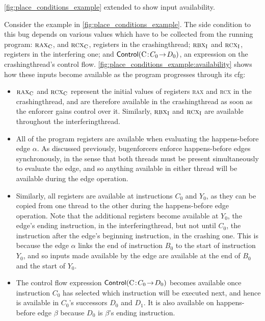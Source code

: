 \begin{sanefig}
  \vspace{-12pt}
  \caption{\autoref{fig:place_conditions_example} extended to show
    input availability.}
  \label{fig:place_conditions_example:availability}
\end{sanefig}

Consider the example in \autoref{fig:place_conditions_example}.  The
\gls{side condition} to this bug depends on various values which have
to be collected from the running program: $\textsc{rax}_{\mathrm{C}}$,
and $\textsc{rcx}_{\mathrm{C}}$, registers in the \gls{crashingthread};
$\textsc{rbx}_{\mathrm{I}}$ and $\textsc{rcx}_{\mathrm{I}}$, registers
in the interfering one; and ${\mathsf{Control}}(\mathrm{C}\!:\!C_0\!\rightarrow\!D_0)$, an
expression on the \gls{crashingthread}'s control flow.
\autoref{fig:place_conditions_example:availability} shows how these
inputs become available as the program progresses through its
\gls{cfg}:
\begin{itemize}
\item $\textsc{rax}_{\mathrm{C}}$ and $\textsc{rcx}_{\mathrm{C}}$ represent
  the initial values of registers \textsc{rax} and \textsc{rcx} in the
  \gls{crashingthread}, and are therefore available in the
  \gls{crashingthread} as soon as the enforcer gains control over it.
  Similarly, $\textsc{rbx}_{\mathrm{I}}$ and
  $\textsc{rcx}_{\mathrm{I}}$ are available throughout the
  \gls{interferingthread}.
\item All of the program registers are available when evaluating the
  happens-before edge $\alpha$.  As discussed previously, {\technique}
  \glspl{bugenforcer} enforce happens-before edges synchronously, in
  the sense that both threads must be present simultaneously to
  evaluate the edge, and so anything available in either thread will
  be available during the edge operation.
\item Similarly, all registers are available at instructions $C_0$ and
  $Y_0$, as they can be copied from one thread to the other during the
  happens-before edge operation.  Note that the additional registers
  become available at $Y_0$, the edge's ending instruction, in the
  \gls{interferingthread}, but not until $C_0$, the instruction after
  the edge's beginning instruction, in the crashing one.  This is
  because the edge $\alpha$ links the end of instruction $B_0$ to the
  start of instruction $Y_0$, and so inputs made available by the edge
  are available at the end of $B_0$ and the start of $Y_0$.
\item The control flow expression ${\mathsf{Control}}(\mathrm{C}\!:\!C_0\!\rightarrow\!D_0)$
  becomes available once instruction $C_0$ has selected which
  instruction will be executed next, and hence is available in $C_0$'s
  successors $D_0$ and $D_1$.  It is also available on happens-before
  edge $\beta$ because $D_0$ is $\beta$'s ending instruction.
\end{itemize}
